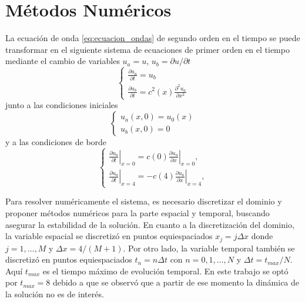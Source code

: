 \documentclass[aps,prb,twocolumn,superscriptaddress,floatfix,longbibliography,10pt]{revtex4-2}
\newcounter{para}
\begin{document}

\section{Métodos Numéricos}

La ecuación de onda \ref{eq:ecuacion_ondas} de segundo orden en el tiempo se puede transformar en el siguiente sistema de ecuaciones de primer orden en el tiempo mediante el cambio de variables $u_a = u$, $u_b = \partial u /\partial t$
\[
  \left \{ \begin{matrix}
     \frac{\partial u_a}{\partial t} = u_b   \\
     \frac{\partial u_b}{\partial t} = c^2(x) \frac{\partial^2 u_a}{\partial x^2}
  \end{matrix} \right .
  \]
junto a las condiciones iniciales
\[ \left \{ \begin{matrix}
     u_a(x,0) = u_0(x) \\
     u_b(x,0) = 0
  \end{matrix} \right .
\]  
y a las condiciones de borde
\[
  \left \{ \begin{matrix}
     \left . \frac{\partial u_a}{\partial t} \right |_{x=0} = c(0) \left . \frac{\partial u_a}{\partial x} \right |_{x=0} ,\\
     \left . \frac{\partial u_a}{\partial t} \right |_{x=4} = - c(4) \left . \frac{\partial u_a}{\partial x} \right |_{x=4},
  \end{matrix} \right .
\]

Para resolver numéricamente el sistema, es necesario discretizar el dominio y proponer métodos numéricos para la parte espacial y temporal, buscando asegurar la estabilidad de la solución. En cuanto a la discretización del dominio, la variable espacial se discretizó en puntos equiespaciados $x_j = j \Delta x$ donde $j = 1,\dots,M$ y $\Delta x = 4/(M+1)$. Por otro lado, la variable temporal también se discretizó en puntos equiespaciados $t_n = n \Delta t $ con $n = 0,1,\dots,N$ y $\Delta t = t_{max}/N$. Aquí $t_{max}$ es el tiempo máximo de evolución temporal. En este trabajo se optó por $t_{max} = 8$ debido a que se observó que a partir de ese momento la dinámica de la solución no es de interés.
\end{document}
